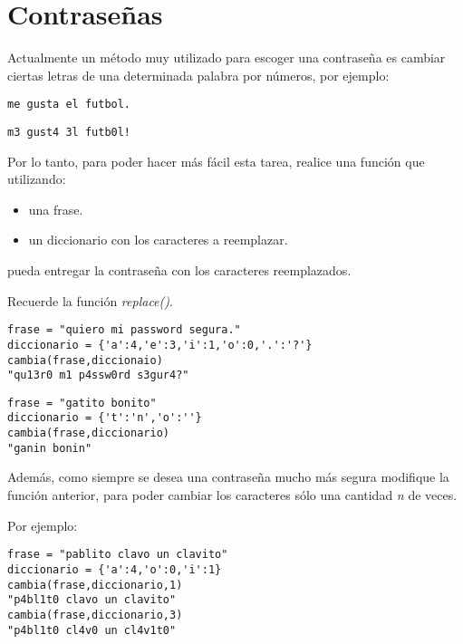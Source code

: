 \section{Contraseñas}

Actualmente un método muy utilizado para escoger una contraseña es
cambiar ciertas letras de una determinada palabra por números, por
ejemplo:

\begin{lstlisting}
me gusta el futbol.
\end{lstlisting}

\begin{lstlisting}
m3 gust4 3l futb0l!
\end{lstlisting}

Por lo tanto, para poder hacer más fácil esta tarea, realice una función
que utilizando:

\begin{itemize}
\item
  una frase.
\item
  un diccionario con los caracteres a reemplazar.
\end{itemize}

pueda entregar la contraseña con los caracteres reemplazados.

Recuerde la función \emph{replace()}.

\begin{lstlisting}
frase = "quiero mi password segura."
diccionario = {'a':4,'e':3,'i':1,'o':0,'.':'?'}
cambia(frase,diccionaio)
"qu13r0 m1 p4ssw0rd s3gur4?"
\end{lstlisting}

\begin{lstlisting}
frase = "gatito bonito"
diccionario = {'t':'n','o':''}
cambia(frase,diccionario)
"ganin bonin"
\end{lstlisting}

Además, como siempre se desea una contraseña mucho más segura modifique
la función anterior, para poder cambiar los caracteres sólo una cantidad
\emph{n} de veces.

Por ejemplo:

\begin{lstlisting}
frase = "pablito clavo un clavito"
diccionario = {'a':4,'o':0,'i':1}
cambia(frase,diccionario,1)
"p4bl1t0 clavo un clavito"
cambia(frase,diccionario,3)
"p4bl1t0 cl4v0 un cl4v1t0"
\end{lstlisting}

